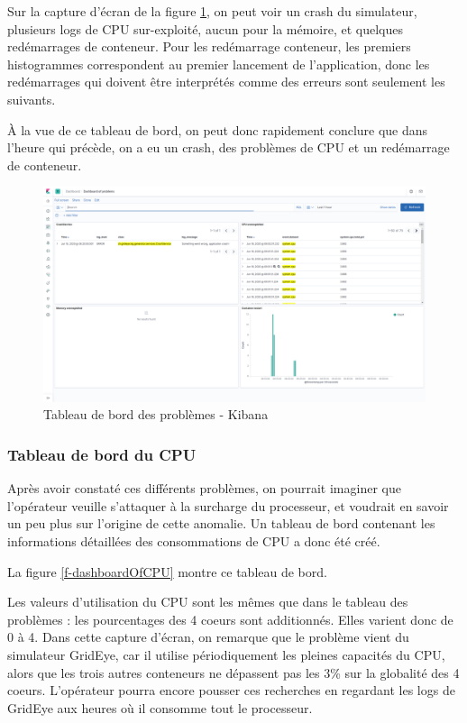 \documentclass[paper=a4, fontsize=11pt]{scrartcl}
\begin{document}
Sur la capture d'écran de la figure \ref{f-dashboardOfProblems}, on peut voir un crash du simulateur, plusieurs logs de CPU sur-exploité, aucun pour la mémoire, et quelques redémarrages de conteneur. Pour les redémarrage conteneur, les premiers histogrammes correspondent au premier lancement de l'application, donc les redémarrages qui doivent être interprétés comme des erreurs sont seulement les suivants.

À la vue de ce tableau de bord, on peut donc rapidement conclure que dans l'heure qui précède, on a eu un crash, des problèmes de CPU et un redémarrage de conteneur.

\begin{figure}[H]
    \centering
    \includegraphics[width=18cm]{img/screenshots/dashboardOfProblems.png}
    \caption{Tableau de bord des problèmes - Kibana}
    \label{f-dashboardOfProblems}
\end{figure}

\subsubsection{Tableau de bord du CPU} \label{sss-tableauDeBordDuCPU}

Après avoir constaté ces différents problèmes, on pourrait imaginer que l'opérateur veuille s'attaquer à la surcharge du processeur, et voudrait en savoir un peu plus sur l'origine de cette anomalie. Un tableau de bord contenant les informations détaillées des consommations de CPU a donc été créé.

La figure \ref{f-dashboardOfCPU} montre ce tableau de bord.

Les valeurs d'utilisation du CPU sont les mêmes que dans le tableau des problèmes : les pourcentages des 4 coeurs sont additionnés. Elles varient donc de 0 à 4. Dans cette capture d'écran, on remarque que le problème vient du simulateur GridEye, car il utilise périodiquement les pleines capacités du CPU, alors que les trois autres conteneurs ne dépassent pas les 3\% sur la globalité des 4 coeurs. L'opérateur pourra encore pousser ces recherches en regardant les logs de GridEye aux heures où il consomme tout le processeur.
\end{document}

